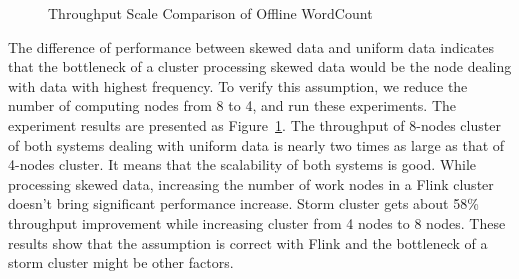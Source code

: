 \begin{figure}[t!]
\begin{center}
   \caption{Throughput Scale Comparison of Offline WordCount}
   \label{fig:offline_throughput_scale}
  \end{center}
\end{figure}

The difference of performance between skewed data and uniform data indicates that the bottleneck of a cluster processing skewed data would be the node dealing with data with highest frequency. To verify this assumption, we reduce the number of computing nodes from 8 to 4, and run these experiments. The experiment results are presented as Figure~\ref{fig:offline_throughput_scale}. The throughput of 8-nodes cluster of both systems dealing with uniform data is nearly two times as large as that of 4-nodes cluster. It means that the scalability of both systems is good. While processing skewed data, increasing the number of work nodes in a Flink cluster doesn't bring significant performance increase. Storm cluster gets about 58\% throughput improvement while increasing cluster from 4 nodes to 8 nodes. These results show that the assumption is correct with Flink and the bottleneck of a storm cluster might be other factors.

